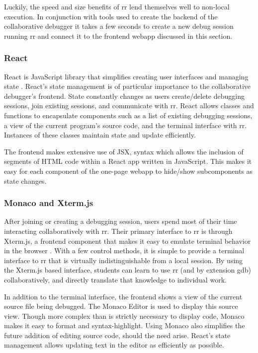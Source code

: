 \documentclass[12pt]{article}
\begin{document}
Luckily, the speed and size benefits of rr lend themselves well to
non-local execution.  In conjunction with tools used to create the
backend of the collaborative debugger it takes a few seconds to create
a new debug session running rr and connect it to the frontend webapp
discussed in this section.

\subsubsection{React}\label{react}

React is JavaScript library that simplifies creating user interfaces
and managing state \cite{react}.  React's state management is of
particular importance to the collaborative debugger's frontend.  State
constantly changes as users create/delete debugging sessions, join
existing sessions, and communicate with rr.  React allows classes and
functions to encapsulate components such as a list of existing
debugging sessions, a view of the current program's source code, and
the terminal interface with rr.  Instances of these classes maintain
state and update efficiently.
\par

The frontend makes extensive use of JSX, syntax which allows the
inclusion of segments of HTML code within a React app written in
JavaScript.  This makes it easy for each component of the one-page
webapp to hide/show subcomponents as state changes.

\subsubsection{Monaco and Xterm.js}\label{xtermjs/monaco}

After joining or creating a debugging session, users spend most of
their time interacting collaboratively with rr.  Their primary
interface to rr is through Xterm.js, a frontend component that makes
it easy to emulate terminal behavior in the browser \cite{xtermjs}.
With a few control methods, it is simple to provide a terminal
interface to rr that is virtually indistinguishable from a local
session.  By using the Xterm.js based interface, students can learn to
use rr (and by extension gdb) collaboratively, and directly translate
that knowledge to individual work.
\par

In addition to the terminal interface, the frontend shows a view of
the current source file being debugged.  The Monaco Editor
\cite{monaco} is used to display this source view.  Though more
complex than is strictly necessary to display code, Monaco makes it
easy to format and syntax-highlight.  Using Monaco also simplifies the
future addition of editing source code, should the need arise.
React's state management allows updating text in the editor as
efficiently as possible.
\end{document}
